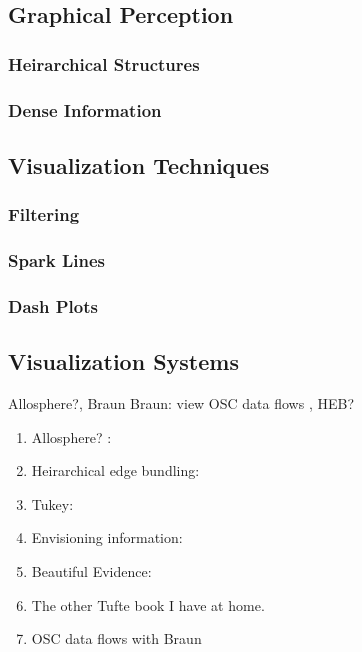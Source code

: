 \subsection{Graphical Perception}
	\subsubsection{Heirarchical Structures}
	\subsubsection{Dense Information}
\subsection{Visualization Techniques}
	\subsubsection{Filtering}
	\subsubsection{Spark Lines}
	\subsubsection{Dash Plots}
\subsection{Visualization Systems}
	Allosphere?, Braun Braun: view OSC data flows , HEB?
\begin{enumerate}
	\item Allosphere? :
	\item Heirarchical edge bundling: 
	\item Tukey: 
	\item Envisioning information: 
	\item Beautiful Evidence: 
	\item The other Tufte book I have at home.
	\item OSC data flows with Braun 
\end{enumerate}

